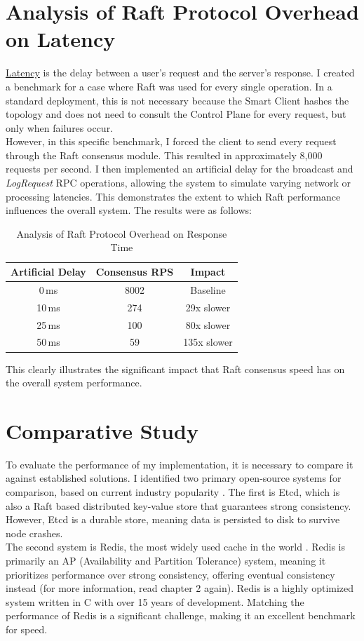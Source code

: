 \documentclass[shortabstract]{iithesis}
\begin{document}
\section{Analysis of Raft Protocol Overhead on Latency}

\hyperref[def:latency]{Latency} is the delay between a user's request and the server's response. I created a benchmark for a case where Raft was used for every single operation. In a standard deployment, this is not necessary because the Smart Client hashes the topology and does not need to consult the Control Plane for every request, but only when failures occur. \\
However, in this specific benchmark, I forced the client to send every request through the Raft consensus module. This resulted in approximately 8,000 requests per second. I then implemented an artificial delay for the broadcast and \textit{LogRequest} RPC operations, allowing the system to simulate varying network or processing latencies. This demonstrates the extent to which Raft performance influences the overall system. The results were as follows:

\begin{table}[h!]
\centering
\caption{Analysis of Raft Protocol Overhead on Response Time}
\label{tab:raft_overhead}
\begin{tabular}{|c|c|c|}
\hline
Artificial Delay & Consensus RPS & Impact \\ \hline
0\,ms & 8002 & Baseline \\ \hline
10\,ms & 274 & 29x slower \\ \hline
25\,ms & 100 & 80x slower \\ \hline
50\,ms & 59 & 135x slower \\ \hline
\end{tabular}
\end{table}

\noindent This clearly illustrates the significant impact that Raft consensus speed has on the overall system performance.

\section{Comparative Study}
To evaluate the performance of my implementation, it is necessary to compare it against established solutions. I identified two primary open-source systems for comparison, based on current industry popularity \cite{dbengines}. The first is Etcd, which is also a Raft based distributed key-value store that guarantees strong consistency. However, Etcd is a durable store, meaning data is persisted to disk to survive node crashes. \\
The second system is Redis, the most widely used cache in the world \cite{redis_cite, dbengines}. Redis is primarily an AP (Availability and Partition Tolerance) system, meaning it prioritizes performance over strong consistency, offering eventual consistency instead (for more information, read chapter 2 again). Redis is a highly optimized system written in C with over 15 years of development. Matching the performance of Redis is a significant challenge, making it an excellent benchmark for speed.
\end{document}
